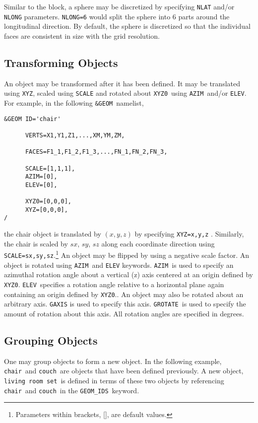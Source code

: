 \documentclass[12pt]{article}
\begin{document}
Similar to the block, a sphere may be discretized by
specifying {\tt NLAT} and/or {\tt NLONG} parameters.  {\tt NLONG=6} would split the sphere
into 6 parts around the longitudinal direction. By default, the sphere is discretized
so that the individual faces are consistent in size with the grid resolution.

\subsection{Transforming Objects}
An object may be transformed after it has been defined.  
It  may be translated using {\tt XYZ}, scaled using {\tt SCALE} and rotated about {\tt XYZ0}\ using {\tt AZIM}\ and/or {\tt ELEV}.
For example, in the following {\tt \&GEOM}\ namelist,

\begin{verbatim}
&GEOM ID='chair'

      VERTS=X1,Y1,Z1,...,XM,YM,ZM,

      FACES=F1_1,F1_2,F1_3,...,FN_1,FN_2,FN_3,

      SCALE=[1,1,1],
      AZIM=[0],
      ELEV=[0],

      XYZ0=[0,0,0],
      XYZ=[0,0,0],
/
\end{verbatim}

\noindent the chair object is translated by $(x,y,z)$ by specifying {\tt XYZ=x,y,z} .
Similarly, the chair is scaled by $sx$, $sy$, $sz$ along each coordinate direction using {\tt SCALE=sx,sy,sz}.\footnote{Parameters within brackets, [], are default values.}
An object may be flipped by using a negative scale factor.
An object is rotated using {\tt AZIM}\ and {\tt ELEV} keywords.
{\tt AZIM}\ is used to specify an azimuthal rotation angle about a vertical (z) axis centered at an origin defined by {\tt XYZ0}.
{\tt ELEV}\ specifies a rotation angle relative to a horizontal plane again containing an origin defined by {\tt XYZ0}..
An object may also be rotated about an arbitrary axis.  
{\tt GAXIS} is used to specify this axis.
{\tt GROTATE}\ is used to specify the amount of rotation about this axis.
All rotation angles are specified in degrees.

\subsection{Grouping Objects}
One may group objects to form a new object.  In the following example,
{\tt chair}\ and {\tt couch}\ are objects that have been defined previously.  A new object, {\tt living room set}\
is defined in terms of these two objects by referencing {\tt chair}\ and {\tt couch}\ in the {\tt GEOM\_IDS}\ keyword.
\end{document}
